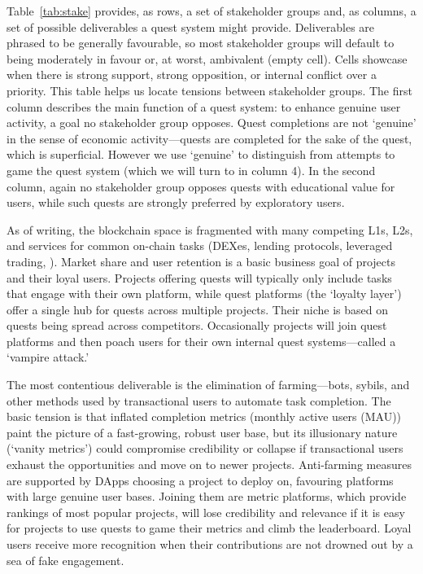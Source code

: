 Table~\ref{tab:stake} provides, as rows, a set of stakeholder groups and, as columns, a set of possible deliverables a quest system might provide. Deliverables are phrased to be generally favourable, so most stakeholder groups will default to being moderately in favour or, at worst, ambivalent (empty cell). Cells showcase when there is strong support, strong opposition, or internal conflict over a priority. This table helps us locate tensions between stakeholder groups. 
The first column describes the main function of a quest system: to enhance genuine user activity, a goal no stakeholder group opposes. Quest completions are not `genuine' in the sense of economic activity---quests are completed for the sake of the quest, which is superficial. However we use `genuine' to distinguish from attempts to game the quest system (which we will turn to in column 4). In the second column, again no stakeholder group opposes quests with educational value for users, while such quests are strongly preferred by exploratory users.

As of writing, the blockchain space is fragmented with many competing L1s, L2s, and services for common on-chain tasks (\eg DEXes, lending protocols, leveraged trading, \etc). Market share and user retention is a basic business goal of projects and their loyal users. Projects offering quests will typically only include tasks that engage with their own platform, while quest platforms (the `loyalty layer') offer a single hub for quests across multiple projects. Their niche is based on quests being spread across competitors. Occasionally projects will join quest platforms and then poach users for their own internal quest systems---called a `vampire attack.'

The most contentious deliverable is the elimination of farming---bots, sybils, and other methods used by transactional users to automate task completion. The basic tension is that inflated completion metrics (\eg monthly active users (MAU)) paint the picture of a fast-growing, robust user base, but its illusionary nature (`vanity metrics') could compromise credibility or collapse if transactional users exhaust the opportunities and move on to newer projects. Anti-farming measures are supported by DApps choosing a project to deploy on, favouring platforms with large genuine user bases. Joining them are metric platforms, which provide rankings of most popular projects, will lose credibility and relevance if it is easy for projects to use quests to game their metrics and climb the leaderboard. Loyal users receive more recognition when their contributions are not drowned out by a sea of fake engagement.

